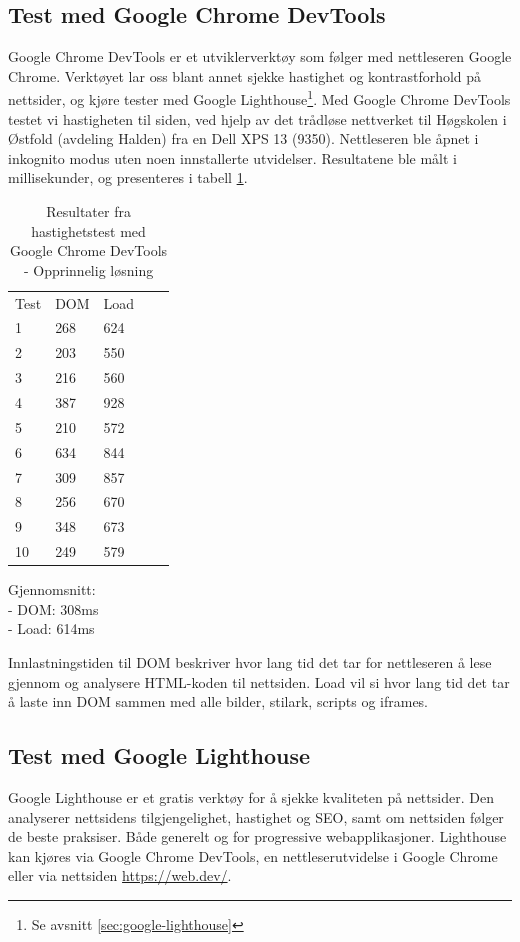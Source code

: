 \subsection{Test med Google Chrome DevTools}
\label{sec:google-chrome-devtools}
Google Chrome DevTools \cite{google2019cdt} er et utviklerverktøy som følger med nettleseren Google Chrome. Verktøyet lar oss blant annet sjekke hastighet og kontrastforhold på nettsider, og kjøre tester med Google Lighthouse\footnote{Se avsnitt \ref{sec:google-lighthouse}}. Med Google Chrome DevTools testet vi hastigheten til siden, ved hjelp av det trådløse nettverket til Høgskolen i Østfold (avdeling Halden) fra en Dell XPS 13 (9350). Nettleseren ble åpnet i inkognito modus uten noen innstallerte utvidelser. Resultatene ble målt i millisekunder, og presenteres i tabell \ref{tab:table-analysis-current-website}.

\begin{table}[H]
\begin{center}
\begin{tabular}{lllll}
Test & DOM & Load &  &  \\
1 & 268 & 624 &  &  \\
2 & 203 & 550 &  &  \\
3 & 216 & 560 &  &  \\
4 & 387 & 928 &  &  \\
5 & 210 & 572 &  &  \\
6 & 634 & 844 &  &  \\
7 & 309 & 857 &  &  \\
8 & 256 & 670 &  &  \\
9 & 348 & 673 &  &  \\
10 & 249 & 579 &  &  \\
\end{tabular}
\end{center}
\caption{\label{tab:table-analysis-current-website}Resultater fra hastighetstest med Google Chrome DevTools - Opprinnelig løsning}
\end{table}

Gjennomsnitt:\\
- DOM: 308ms\\
- Load: 614ms

Innlastningstiden til DOM beskriver hvor lang tid det tar for nettleseren å lese gjennom og analysere HTML-koden til nettsiden. Load vil si hvor lang tid det tar å laste inn DOM sammen med alle bilder, stilark, scripts og iframes.

\subsection{Test med Google Lighthouse}
\label{sec:analysis-current-lighthouse}
\label{sec:google-lighthouse}
Google Lighthouse \cite{google2018lig} er et gratis verktøy for å sjekke kvaliteten på nettsider. Den analyserer nettsidens tilgjengelighet, hastighet og SEO, samt om nettsiden følger de beste praksiser. Både generelt og for progressive webapplikasjoner. Lighthouse kan kjøres via Google Chrome DevTools, en nettleserutvidelse i Google Chrome eller via nettsiden \url{https://web.dev/}.

